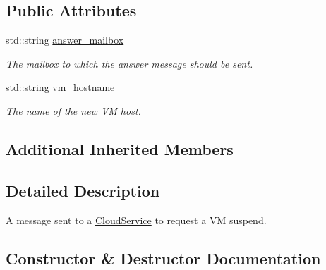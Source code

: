 \subsection*{Public Attributes}
\begin{DoxyCompactItemize}
\item 
\mbox{\label{classwrench_1_1_cloud_service_suspend_v_m_request_message_a098f26ba796ea02ed812f42ca2ec69ab}} 
std\+::string \hyperlink{classwrench_1_1_cloud_service_suspend_v_m_request_message_a098f26ba796ea02ed812f42ca2ec69ab}{answer\+\_\+mailbox}
\begin{DoxyCompactList}\small\item\em The mailbox to which the answer message should be sent. \end{DoxyCompactList}\item 
\mbox{\label{classwrench_1_1_cloud_service_suspend_v_m_request_message_afe8e071668d420d40e83a21e2472d788}} 
std\+::string \hyperlink{classwrench_1_1_cloud_service_suspend_v_m_request_message_afe8e071668d420d40e83a21e2472d788}{vm\+\_\+hostname}
\begin{DoxyCompactList}\small\item\em The name of the new VM host. \end{DoxyCompactList}\end{DoxyCompactItemize}
\subsection*{Additional Inherited Members}


\subsection{Detailed Description}
A message sent to a \hyperlink{classwrench_1_1_cloud_service}{Cloud\+Service} to request a VM suspend. 

\subsection{Constructor \& Destructor Documentation}
\mbox{\label{classwrench_1_1_cloud_service_suspend_v_m_request_message_a4cb16193c85d189c65fabf650249b535}} 
